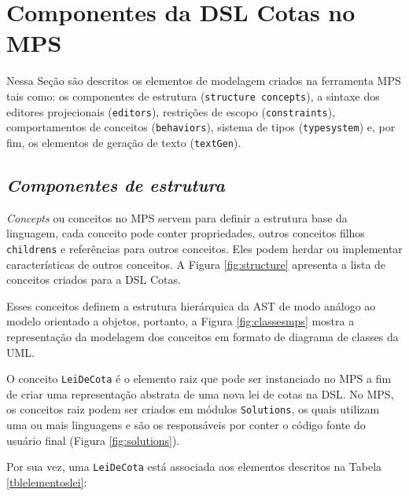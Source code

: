 \section{Componentes da DSL Cotas no \gls{MPS}}
\label{sec:mps}

Nessa Seção são descritos os elementos de modelagem criados na ferramenta \gls{MPS} tais como: os componentes de estrutura (\texttt{structure concepts}), a sintaxe dos editores projecionais (\texttt{editors}), restrições de escopo (\texttt{constraints}), comportamentos de conceitos (\texttt{behaviors}), sistema de tipos (\texttt{typesystem}) e, por fim, os elementos de geração de texto (\texttt{textGen}).

\subsection{\textit{Componentes de estrutura}}
\label{sub:sec:estrutura}

\textit{Concepts} ou conceitos no \gls{MPS} servem para definir a estrutura base da linguagem, cada conceito pode conter propriedades, outros conceitos filhos \texttt{childrens} e referências para outros conceitos. Eles podem herdar ou implementar características de outros conceitos. A Figura \ref{fig:structure} apresenta a lista de conceitos criados para a DSL Cotas.





Esses conceitos definem a estrutura hierárquica da \gls{AST} de modo análogo ao modelo orientado a objetos, portanto, a Figura \ref{fig:classesmps} mostra a representação da modelagem dos conceitos em formato de diagrama de classes da \gls{UML}.




\newpage
O conceito \texttt{LeiDeCota} é o elemento raiz  que pode ser instanciado no \gls{MPS} a fim de criar uma representação abstrata de uma nova lei de cotas na DSL. No \gls{MPS}, os conceitos raiz podem ser criados em módulos \texttt{Solutions}, os quais utilizam uma ou mais linguagens e são os responsáveis por conter o código fonte do usuário final (Figura \ref{fig:solutions}).



Por sua vez, uma \texttt{LeiDeCota} está associada aos elementos descritos na Tabela \ref{tblelementoslei}:



